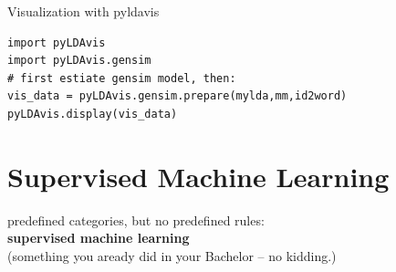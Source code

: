 \documentclass{beamer}
\begin{document}
\begin{frame}[fragile]{Visualization with pyldavis}
\begin{lstlisting}
import pyLDAvis
import pyLDAvis.gensim
# first estiate gensim model, then:
vis_data = pyLDAvis.gensim.prepare(mylda,mm,id2word)
pyLDAvis.display(vis_data)
\end{lstlisting}
\end{frame}







\section[Supervised Machine Learning]{Supervised Machine Learning}

\begin{frame}[plain]
	predefined categories, but no predefined rules:\\ \textbf{supervised machine learning}\\
	\vspace{1cm}\hspace{1cm} \onslide<2> \footnotesize{(something you aready did in your Bachelor -- no kidding.)}
\end{frame}
\end{document}

